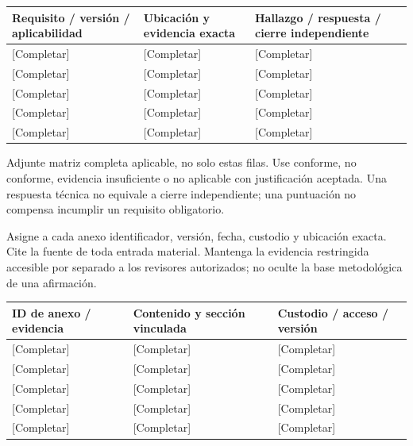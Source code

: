 {\sffamily\fontsize{8.3}{10.3}\selectfont\begin{longtable}{@{}P{51.14mm} P{57.74mm} P{56.09mm}@{}}
\toprule
\textbf{Requisito / versión / aplicabilidad} & \textbf{Ubicación y evidencia exacta} & \textbf{Hallazgo / respuesta / cierre independiente}\\\midrule\endhead
\rule{0pt}{7.7mm}[Completar] & [Completar] & [Completar]\\\hline
\rule{0pt}{7.7mm}[Completar] & [Completar] & [Completar]\\\hline
\rule{0pt}{7.7mm}[Completar] & [Completar] & [Completar]\\\hline
\rule{0pt}{7.7mm}[Completar] & [Completar] & [Completar]\\\hline
\rule{0pt}{7.7mm}[Completar] & [Completar] & [Completar]\\\hline
\end{longtable}}
\begin{Notice}Adjunte matriz completa aplicable, no solo estas filas. Use conforme, no conforme, evidencia insuficiente o no aplicable con justificación aceptada. Una respuesta técnica no equivale a cierre independiente; una puntuación no compensa incumplir un requisito obligatorio.\end{Notice}
\begin{Notice}Asigne a cada anexo identificador, versión, fecha, custodio y ubicación exacta. Cite la fuente de toda entrada material. Mantenga la evidencia restringida accesible por separado a los revisores autorizados; no oculte la base metodológica de una afirmación.\end{Notice}
{\sffamily\fontsize{8.3}{10.3}\selectfont\begin{longtable}{@{}P{39.59mm} P{75.89mm} P{49.49mm}@{}}
\toprule
\textbf{ID de anexo / evidencia} & \textbf{Contenido y sección vinculada} & \textbf{Custodio / acceso / versión}\\\midrule\endhead
\rule{0pt}{7.7mm}[Completar] & [Completar] & [Completar]\\\hline
\rule{0pt}{7.7mm}[Completar] & [Completar] & [Completar]\\\hline
\rule{0pt}{7.7mm}[Completar] & [Completar] & [Completar]\\\hline
\rule{0pt}{7.7mm}[Completar] & [Completar] & [Completar]\\\hline
\rule{0pt}{7.7mm}[Completar] & [Completar] & [Completar]\\\hline
\end{longtable}}
